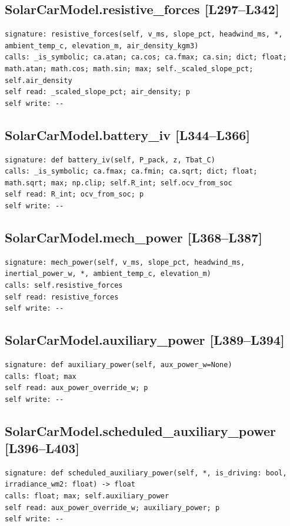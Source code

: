 \documentclass[a4paper,10pt,oneside]{book}
\begin{document}
\subsection*{SolarCarModel.resistive\_forces [L297--L342]}
\begin{lstlisting}[numbers=none]
signature: resistive_forces(self, v_ms, slope_pct, headwind_ms, *, ambient_temp_c, elevation_m, air_density_kgm3)
calls: _is_symbolic; ca.atan; ca.cos; ca.fmax; ca.sin; dict; float; math.atan; math.cos; math.sin; max; self._scaled_slope_pct; self.air_density
self read: _scaled_slope_pct; air_density; p
self write: --
\end{lstlisting}
\subsection*{SolarCarModel.battery\_iv [L344--L366]}
\begin{lstlisting}[numbers=none]
signature: def battery_iv(self, P_pack, z, Tbat_C)
calls: _is_symbolic; ca.fmax; ca.fmin; ca.sqrt; dict; float; math.sqrt; max; np.clip; self.R_int; self.ocv_from_soc
self read: R_int; ocv_from_soc; p
self write: --
\end{lstlisting}
\subsection*{SolarCarModel.mech\_power [L368--L387]}
\begin{lstlisting}[numbers=none]
signature: mech_power(self, v_ms, slope_pct, headwind_ms, inertial_power_w, *, ambient_temp_c, elevation_m)
calls: self.resistive_forces
self read: resistive_forces
self write: --
\end{lstlisting}
\subsection*{SolarCarModel.auxiliary\_power [L389--L394]}
\begin{lstlisting}[numbers=none]
signature: def auxiliary_power(self, aux_power_w=None)
calls: float; max
self read: aux_power_override_w; p
self write: --
\end{lstlisting}
\subsection*{SolarCarModel.scheduled\_auxiliary\_power [L396--L403]}
\begin{lstlisting}[numbers=none]
signature: def scheduled_auxiliary_power(self, *, is_driving: bool, irradiance_wm2: float) -> float
calls: float; max; self.auxiliary_power
self read: aux_power_override_w; auxiliary_power; p
self write: --
\end{lstlisting}
\end{document}
